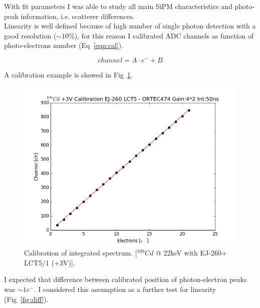 \documentclass[10pt,a4paper, openany]{book}
\begin{document}
With fit parameters I was able to study all main SiPM characteristics and photo-peak information, i.e. scatterer differences.\\
Linearity is well defined because of high number of single photon detection with a good resolution ($\sim 10\%$), for this reason I calibrated ADC channels as function of photo-electrons number (Eq~\ref{eqn:cal}).

\begin{equation}
\label{eqn:cal}
channel = A \cdot e^- + B
\end{equation}

A calibration example is showed in Fig~\ref{fig:cal}.

\begin{figure}[!h]
\begin{center}
\includegraphics[scale=0.37]{imm/cal.png}
\end{center}
\caption{Calibration of integrated spectrum. [$^{109}Cd$ @ 22keV with EJ-260+ LCT5/1 (+3V)].} 
\label{fig:cal}
\end{figure}

I expected that difference between calibrated position of photon-electron peaks was $\sim 1e^-$. I considered this assumption as a further test for linearity (Fig~\ref{fig:diff}).
\end{document}
